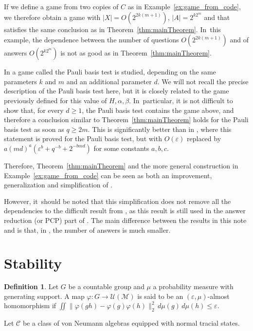 \documentclass[JEP,XML,SOM,Unicode,published]{cedram}
\theoremstyle{plain}
\theoremstyle{definition}
\newtheorem{definition}[theorem]{Definition}
\newcommand{\cM}{\mathcal{M}}
\newcommand{\vn}{\mathcal{C}}
\newcommand{\cU}{\mathcal{U}}
\begin{document}
If we define a game from two copies of $C$ as in Example~\ref{ex:game_from_code}, we therefore obtain a game with $|X| = O(2^{2k(m+1)})$, $|A| = 2^{k2^m}$ and that satisfies the same conclusion as in Theorem~\ref{thm:mainTheorem}. In~this example, the dependence between the number of questions $O(2^{2k(m+1)})$ and of answers $O(2^{k 2^m})$ is not as good as in Theorem~\ref{thm:mainTheorem}.

In \cite[\S 7.3]{MIPRE} a game called the Pauli basis test is
studied, depending on the same parameters $k$ and $m$ and an
additional parameter $d$. We will not recall the precise description
of the Pauli basis test here, but it is closely related to the game
previously defined for this value of $H,\alpha,\beta$. In~particular,
it is not difficult to show that, for every $d\geq 1$, the Pauli basis
test contains the game above, and therefore a conclusion similar to
Theorem~\ref{thm:mainTheorem} holds for the Pauli basis test as soon
as $q \geq 2m$. This is significantly better than in \cite[Th.\,7.14]{MIPRE}, where this statement is proved for the Pauli basis
test, but with $O(\varepsilon)$ replaced by $a(md)^a(\varepsilon^b +
q^{-b}+2^{-bmd})$ for some constants $a,b,c$.

Therefore, Theorem~\ref{thm:mainTheorem} and the more general construction in Example~\ref{ex:game_from_code} can be seen as both an improvement, generalization and simplification of \cite[Th.\,7.14]{MIPRE}.

However, it~should be noted that this simplification does not remove
all the dependencies to the difficult result from
\cite{MR4399717,MR4518868}, as this result is still used in the answer
reduction (or PCP) part of \cite{MIPRE}. The main difference between
the results in this note and \cite{MR4518868} is that, in
\cite{MR4518868}, the number of answers is much smaller.

\section{Stability}\label{sec:stability}

\begin{definition} Let $G$ be a countable group and $\mu$ a probability measure with generating support. A map $\varphi:G\to \cU(\cM)$ is said to be an $(\varepsilon,\mu)$-almost homomorphism if $\iint \| \varphi(gh) - \varphi(g) \varphi(h)\|_2^2\,d\mu(g) \,d\mu(h) \leq \varepsilon$.
\end{definition}
Let $\vn$ be a class of von Neumann algebras equipped with normal tracial states.
\end{document}
